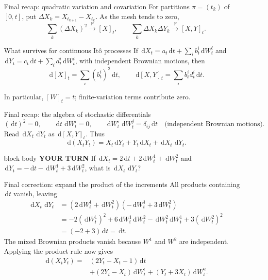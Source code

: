 \documentclass[handout,10pt,aspectratio=169]{beamer}
\newenvironment{pausebox}{\begin{beamercolorbox}[rounded=true,sep=0.8em,wd=\textwidth]{block body}
  \textbf{\color{CourseGold}YOUR TURN}\quad}{\end{beamercolorbox}}
\newcommand{\dd}{\,\mathrm d}
\newcommand{\Pp}{\mathbb P}
\newcommand{\1}{\mathbf 1}
\begin{document}
\begin{frame}{Final recap: quadratic variation and covariation}
For partitions \(\pi=(t_k)\) of \([0,t]\), put
\(\Delta X_k=X_{t_{k+1}}-X_{t_k}\). As the mesh tends to zero,
\[
\sum_k(\Delta X_k)^2\xrightarrow{\Pp}[X]_t,
\qquad
\sum_k\Delta X_k\Delta Y_k\xrightarrow{\Pp}[X,Y]_t.
\]
\begin{block}{What survives for continuous It\^o processes}
If \(\dd X_t=a_t\dd t+\sum_i b_t^i\dd W_t^i\) and
\(\dd Y_t=c_t\dd t+\sum_i d_t^i\dd W_t^i\), with independent Brownian
motions, then
\[
\dd[X]_t=\sum_i(b_t^i)^2\dd t,
\qquad
\dd[X,Y]_t=\sum_i b_t^i d_t^i\dd t.
\]
\end{block}
In particular, \([W]_t=t\); finite-variation terms contribute zero.
\end{frame}

\begin{frame}{Final recap: the algebra of stochastic differentials}
\[
(\dd t)^2=0,\qquad \dd t\,\dd W_t^i=0,\qquad
\dd W_t^i\,\dd W_t^j=\delta_{ij}\dd t
\quad\text{(independent Brownian motions).}
\]
Read \(\dd X_t\,\dd Y_t\) as \(\dd[X,Y]_t\). Thus
\[
\boxed{\dd(X_tY_t)=X_t\dd Y_t+Y_t\dd X_t+\dd X_t\,\dd Y_t.}
\]
\begin{pausebox}
If \(\dd X_t=2\dd t+2\dd W_t^1+\dd W_t^2\) and
\(\dd Y_t=-\dd t-\dd W_t^1+3\dd W_t^2\), what is
\(\dd X_t\,\dd Y_t\)?
\end{pausebox}
\end{frame}

\begin{frame}{Final correction: expand the product of the increments}
All products containing \(\dd t\) vanish, leaving
\[
\begin{aligned}
\dd X_t\,\dd Y_t
&=(2\dd W_t^1+\dd W_t^2)(-\dd W_t^1+3\dd W_t^2)\\
&=-2(\dd W_t^1)^2+6\dd W_t^1\dd W_t^2
 -\dd W_t^2\dd W_t^1+3(\dd W_t^2)^2\\
&=(-2+3)\dd t=\boxed{\dd t}.
\end{aligned}
\]
The mixed Brownian products vanish because \(W^1\) and \(W^2\) are independent.
Applying the product rule now gives
\[
\boxed{\begin{aligned}
\dd(X_tY_t)={}&(2Y_t-X_t+1)\dd t\\
&+(2Y_t-X_t)\dd W_t^1+(Y_t+3X_t)\dd W_t^2.
\end{aligned}}
\]
\end{frame}
\end{document}
